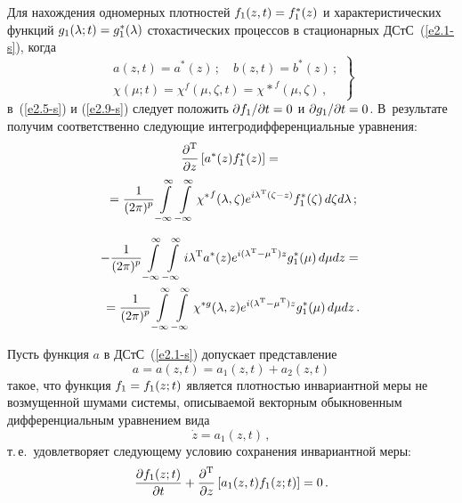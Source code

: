\begin{multicols}{2}
Для нахождения одномерных плотностей $f_1(z,t) \hm= f_1^* (z)$ и характеристических
функций $g_1(\la;t) \hm= g_1^* (\la)$ стохастических процессов в стационарных
ДСтС~(\ref{e2.1-s}), когда
    \begin{equation}
    \left.
    \begin{array}{c}
    a(z,t) = a^*(z)\,;\quad b(z,t)=b^*(z)\,;\\[9pt]
    \chi(\mu;t)= \chi^f(\mu,\zeta, t)={\chi*}^f (\mu, \zeta)\,,
    \end{array}
    \right\}
    \label{e2.19-s}
    \end{equation}
    в~(\ref{e2.5-s}) и (\ref{e2.9-s}) следует положить
$\prt f_1/\prt t \hm= 0$ и $\prt g_1/ \prt t\hm =0$.
В~результате получим соответственно сле\-ду\-ющие интегродифференциальные уравнения:
    \begin{multline*}
    \fr{\prt^{\mathrm{T}}}{\prt z}\lk a^* (z) f_1^* (z)\rk ={}\\
    {}=
    \fr{1}{(2\pi)^p} \iin \iin {\chi^*}^f (\la,\zeta) e^{i\la^{\mathrm{T}}(\zeta-z)} f_1^*
    (\zeta)\, d\zeta d\la\,; %
    \end{multline*}

    \vspace*{-12pt}

    \noindent
\begin{multline*}
-\fr{1}{(2\pi)^p} \iin  \iin i\la^{\mathrm{T}} a^*(z) e^{i(\la^{\mathrm{T}}-\mu^{\mathrm{T}})z} g_1^*(\mu)
   \, d\mu dz={}\\
{}=\fr{1}{(2\pi)^p} \iin  \iin \chi^{*g} (\la, z) e^{i(\la^{\mathrm{T}}-\mu^{\mathrm{T}})z}
    g_1^*(\mu) \,d\mu dz\,. %
    \end{multline*}

Пусть функция $a$ в ДСтС~(\ref{e2.1-s}) допускает пред\-став\-ле\-ние
    \begin{equation}
    a= a(z,t) = a_1(z,t) +a_2 (z,t)
    \label{e2.22-s}
\end{equation}
такое, что функция  $f_1\hm=f_1(z;t)$ является плот\-ностью инвариантной
меры не возмущенной шумами сис\-те\-мы, описываемой векторным
обыкновенным дифференциальным уравнением вида
\begin{equation}
\dot z = a_1 (z,t)\,,
\label{e2.23-s}
\end{equation}
т.\,е.\ удовлетворяет следующему условию сохранения инвариантной меры:
    \begin{equation}
   \displaystyle\frac{\displaystyle \partial f_1 (z;t)\mathstrut}{\displaystyle \partial t\mathstrut}+ \displaystyle\frac{\displaystyle \partial^{\mathrm{T}}\mathstrut}{\displaystyle \partial z\mathstrut} \left[
   a_1 (z,t) f_1(z;t)\right] =0\,.\label{e2.24-s}
   \end{equation}


\end{multicols}
